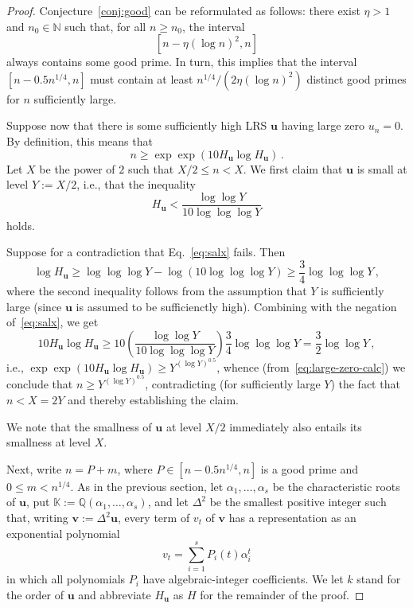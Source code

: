 \documentclass[preprint,12pt]{elsarticle}
\begin{document}
\begin{proof}

Conjecture~\ref{conj:good} can be reformulated as follows: there
exist $\eta > 1$ and $n_0 \in \mathbb{N}$ such that, for all $n \geq n_0$, the interval
\[
[n-\eta(\log n)^2, n]
\]
always contains some good prime. In turn, this implies that the
interval $[n-0.5n^{1/4},n]$ must contain at least
$n^{1/4}/(2\eta(\log n)^2)$
distinct good primes for $n$ sufficiently large.

Suppose now that there is some sufficiently high LRS $\mathbf{u}$
having large zero $u_n = 0$. By definition, this means that
\begin{equation}
\label{eq:large-zero-calc}  
  n \geq \exp \exp (10 H_{\mathbf{u}} \log H_{\mathbf{u}}) \, .
\end{equation}
Let $X$ be the power of $2$ such that $X/2 \leq n < X$. We
first claim that $\mathbf{u}$ is small at level $Y := X/2$, i.e., that the
inequality
\begin{equation}
  \label{eq:salx}
  H_{\mathbf{u}} < \frac{\log \log Y}{10\log \log \log Y}
\end{equation}  
holds.

Suppose for a contradiction that Eq.~\eqref{eq:salx} fails. Then
\[  \log H_{\mathbf{u}} \geq \log \log \log Y
 - \log(10 \log \log \log Y) \geq \frac{3}{4}\log \log \log Y \, , \]
where the second inequality follows from the assumption that $Y$ is
sufficiently large (since $\mathbf{u}$ is assumed to be sufficienctly
high). Combining with the negation of~\eqref{eq:salx}, we get
\[ 10 H_{\mathbf{u}} \log H_{\mathbf{u}} \geq 10 \left(
  \frac{\log \log Y}{10 \log \log \log Y} \right) \frac{3}{4} \log
\log \log Y = \frac{3}{2}\log \log Y
 \, , \]
i.e., $\exp \exp (10 H_{\mathbf{u}} \log H_{\mathbf{u}}) \geq Y^{(\log Y)^{0.5}}$,
whence (from~\eqref{eq:large-zero-calc}) we conclude that
$n \geq  Y^{(\log Y)^{0.5}}$, contradicting (for sufficiently large
$Y$) the fact that $n < X = 2Y$ and thereby establishing the claim.

We note that the smallness of $\mathbf{u}$ at level $X/2$ immediately
also entails its smallness at level $X$.

Next, write $n=P+m$, where
$P\in [n-0.5n^{1/4},n]$ is a good prime and
$0\leq m< n^{1/4}$.  As in the previous
section, let $\alpha_1,\ldots,\alpha_s$ be the
characteristic roots of $\mathbf{u}$, put $\mathbb{K} :=
\mathbb{Q}(\alpha_1,\ldots,\alpha_s)$, and let $\Delta^2$ be
the smallest positive integer such that, writing
$\mathbf{v} := \Delta^2 \mathbf{u}$, every term of $v_t$ of $\mathbf{v}$ has a
representation as an exponential polynomial
\[
  v_t = \sum_{i=1}^s P_i(t)\alpha_i^{t}
  \]
  in which all polynomials $P_i$ have algebraic-integer coefficients.
We let $k$ stand for the order of $\mathbf{u}$ and abbreviate
$H_{\mathbf{u}}$ as $H$ for the remainder of the proof.
  

\end{proof}
\end{document}
